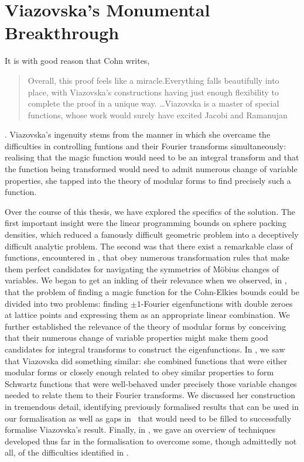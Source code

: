 \section{Viazovska's Monumental Breakthrough}

It is with good reason that Cohn writes,
\begin{quote}
    Overall, this proof feels like a miracle.Everything falls beautifully into place, with Viazovska’s constructions having just enough flexibility to complete the proof in a unique way. \ldots Viazovska is a master of special functions, whose work would surely have excited Jacobi and Ramanujan
\end{quote}
\cite[p.21]{CohnOnViazovskaICM}. Viazovska's ingenuity stems from the manner in which she overcame the difficulties in controlling funtions and their Fourier transforms simultaneously: realising that the magic function would need to be an integral transform and that the function being transformed would need to admit numerous change of variable properties, she tapped into the theory of modular forms to find precisely such a function.

Over the course of this thesis, we have explored the specifics of the solution. The first important insight were the linear programming bounds on sphere packing densities, which reduced a famously difficult geometric problem into a deceptively difficult analytic problem. The second was that there exist a remarkable class of functions, encountered in , that obey numerous transformation rules that make them perfect candidates for navigating the symmetries of Möbius changes of variables. We began to get an inkling of their relevance when we observed, in , that the problem of finding a magic function for the Cohn-Elkies bounds could be divided into two problems: finding $\pm 1$-Fourier eigenfunctions with double zeroes at lattice points and expressing them as an appropriate linear combination. We further established the relevance of the theory of modular forms by conceiving that their numerous change of variable properties might make them good candidates for integral transforms to construct the eigenfunctions. In , we saw that Viazovska did something similar: she combined functions that were either modular forms or closely enough related to obey similar properties to form Schwartz functions that were well-behaved under precisely those variable changes needed to relate them to their Fourier transforms. We discussed her construction in tremendous detail, identifying previously formalised results that can be used in our formalisation as well as gaps in \mathlib\ that would need to be filled to successfully formalise Viazovska's result. Finally, in , we gave an overview of techniques developed thus far in the formalisation to overcome some, though admittedly not all, of the difficulties identified in .